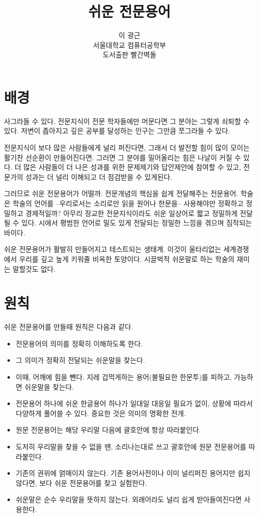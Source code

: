 \documentclass[11pt]{article}
\title{쉬운 전문용어}
\author{
이 광근\\ 
{\footnotesize 서울대학교 컴퓨터공학부}\\
{\footnotesize 도서출판 빨간벽돌}
}
\date{}
\begin{document}
\maketitle

\section*{배경}
사그라들 수 있다. 전문지식이 전문 학자들에만 머문다면 그 분야는
그렇게 쇠퇴할 수 있다. 저변이 좁아지고 깊은 공부를 달성하는 인구는
그만큼 쪼그라들 수 있다.

전문지식이 보다 많은 사람들에게 널리 퍼진다면, 그래서 더 발전할 힘이 많이
모이는 활기찬 선순환이 만들어진다면. 그러면 그 분야를 밀어올리는 힘은 나날이
커질 수 있다. 더 많은 사람들이 더 나은 성과를 위한 문제제기와 답안제안에
참여할 수 있고, 전문가의 성과는 더 널리 이해되고 더 점검받을 수 있게된다.

그러므로 쉬운 전문용어가 어떨까. 전문개념의 핵심을 쉽게 전달해주는
전문용어. 학술은 학술의 언어를 --우리로서는 소리로만 읽을 원어나
한문을-- 사용해야만 정확하고 정밀하고 경제적일까? 아무리 정교한
전문지식이라도 쉬운 일상어로 짧고 정밀하게 전달될 수 있다. 시에서
평범한 언어로 밀도 있게 전달되는 정밀한 느낌을 겪으며 짐작되는 바이다.

쉬운 전문용어가 활발히 만들어지고 테스트되는 생태계.
이것이 울타리없는 세계경쟁에서 우리를 깊고 높게 키워줄 비옥한
토양이다. 시끌벅적 쉬운말로 하는 학술의 재미는 말할것도 없다.

\section*{원칙}
쉬운 전문용어를 만들때 원칙은 다음과 같다.
\begin{itemize}
\item 전문용어의 의미를 정확히 이해하도록 한다.
\item 그 의미가 정확히 전달되는 쉬운말을 찾는다.
\item 이때, 어깨에 힘을 뺀다. 지레 겁먹게하는 용어(불필요한 한문투)를
  피하고, 가능하면 쉬운말을 찾는다.
\item 전문용어 하나에 쉬운 한글용어 하나가 일대일 대응일 필요가 없이,
  상황에 따라서 다양하게 풀어쓸 수 있다. 중요한 것은 의미의 명확한
  전개.
\item 원문 전문용어는 해당 우리말 다음에 괄호안에 항상 따라붙인다.
\item 도저히 우리말을 찾을 수 없을 땐, 소리나는대로 쓰고 괄호안에 원문
  전문용어를 따라붙인다.
\item 기존의 권위에 얽매이지 않는다. 기존 용어사전이나 이미 널리퍼진
  용어지만 쉽지않다면, 보다 쉬운 전문용어를 찾고 실험한다.
\item 쉬운말은 순수 우리말을 뜻하지 않는다. 외래어라도 널리 쉽게
  받아들여진다면 사용한다.
\end{itemize}



\printindex
\end{document}
